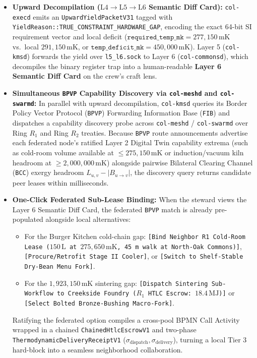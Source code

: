 \begin{itemize}
    \item \textbf{Upward Decompilation ($\mathrm{L4} \to \mathrm{L5} \to \mathrm{L6}$ Semantic Diff Card):} \texttt{col-execd} emits an \texttt{UpwardYieldPacketV31} tagged with \texttt{YieldReason::TRUE\_CONSTRAINT\_HARDWARE\_GAP}, encoding the exact 64-bit SI requirement vector and local deficit ($\texttt{required\_temp\_mk} = 277{,}150\,\mathrm{mK}$ vs.\ local $291{,}150\,\mathrm{mK}$, or $\texttt{temp\_deficit\_mk} = 450{,}000\,\mathrm{mK}$). Layer 5 (\texttt{col-kmsd}) forwards the yield over \texttt{l5\_l6.sock} to Layer 6 (\texttt{col-commonsd}), which decompiles the binary register trap into a human-readable \textbf{Layer 6 Semantic Diff Card} on the crew's craft lens.
    \item \textbf{Simultaneous \texttt{BPVP} Capability Discovery via \texttt{col-meshd} and \texttt{col-swarmd}:} In parallel with upward decompilation, \texttt{col-kmsd} queries its Border Policy Vector Protocol (\texttt{BPVP}) Forwarding Information Base (\texttt{FIB}) and dispatches a capability discovery probe across \texttt{col-meshd} / \texttt{col-swarmd} over Ring $R_1$ and Ring $R_2$ treaties. Because \texttt{BPVP} route announcements advertise each federated node's ratified Layer 2 Digital Twin capability extrema (such as cold-room volume available at $\le 275{,}150\,\mathrm{mK}$ or induction/vacuum kiln headroom at $\ge 2{,}000{,}000\,\mathrm{mK}$) alongside pairwise Bilateral Clearing Channel (\texttt{BCC}) exergy headroom $L_{u,v} - |B_{u \to v}|$, the discovery query returns candidate peer leases within milliseconds.
    \item \textbf{One-Click Federated Sub-Lease Binding:} When the steward views the Layer 6 Semantic Diff Card, the federated \texttt{BPVP} match is already pre-populated alongside local alternatives:
    \begin{itemize}
        \item For the Burger Kitchen cold-chain gap: \texttt{[Bind Neighbor R1 Cold-Room Lease ($150\,\mathrm{L}$ at $275{,}650\,\mathrm{mK}$, 45 m walk at North-Oak Commons)]}, \texttt{[Procure/Retrofit Stage II Cooler]}, or \texttt{[Switch to Shelf-Stable Dry-Bean Menu Fork]}.
        \item For the $1{,}923{,}150\,\mathrm{mK}$ sintering gap: \texttt{[Dispatch Sintering Sub-Workflow to Creekside Foundry ($R_1$ HTLC Escrow: $18.4\,\mathrm{MJ}$)]} or \texttt{[Select Bolted Bronze-Bushing Macro-Fork]}.
    \end{itemize}
    Ratifying the federated option compiles a cross-pool BPMN Call Activity wrapped in a chained \texttt{ChainedHtlcEscrowV1} and two-phase \texttt{ThermodynamicDeliveryReceiptV1} ($\sigma_{\mathrm{dispatch}}, \sigma_{\mathrm{delivery}}$), turning a local Tier 3 hard-block into a seamless neighborhood collaboration.
\end{itemize}

